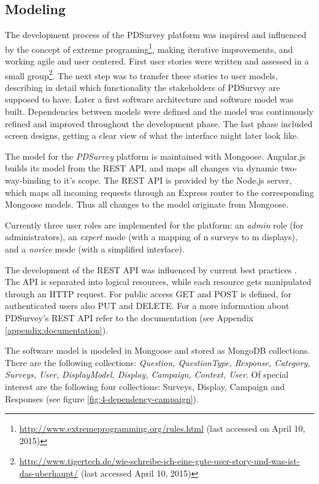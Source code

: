 \clearpage

\subsection{Modeling}
\label{chapter:implementation:modeling}

	The development process of the PDSurvey platform was inspired and influenced by the concept of extreme programing\footnote{\url{http://www.extremeprogramming.org/rules.html} (last accessed on April 10, 2015)}, making iterative improvements, and working agile and user centered. First user stories were written and assessed in a small group\footnote{\url{http://www.tigertech.de/wie-schreibe-ich-eine-gute-user-story-und-was-ist-das-uberhaupt/} (last accessed April 10, 2015)}. The next step was to transfer these stories to user models, describing in detail which functionality the stakeholders of PDSurvey are supposed to have. Later a first software architecture and software model was built. Dependencies between models were defined and the model was continuously refined and improved throughout the development phase. The last phase included screen designs, getting a clear view of what the interface might later look like.

	The model for the \textit{PDSurvey} platform is maintained with Mongoose. Angular.js builds its model from the REST API, and maps all changes via dynamic two-way-binding to it's scope. The REST API is provided by the Node.js server, which maps all incoming requests through an Express router to the corresponding Mongoose models. Thus all changes to the model originate from Mongoose.

	Currently three user roles are implemented for the platform: an \textit{admin} role (for administrators), an \textit{expert} mode (with a mapping of n surveys to m displays), and a \textit{novice} mode (with a simplified interface).

	The development of the REST API was influenced by current best practices \cite{Sahni2015RESTAPI, TutsPlus2015RESTAPI, hughes2012einfuhrung}. The API is separated into logical resources, while each resource gets manipulated through an HTTP request. For public access GET and POST is defined, for authenticated users also PUT and DELETE. For a more information about PDSurvey's REST API refer to the documentation (see Appendix \ref{appendix:documentation}).

	The software model is modeled in Mongoose and stored as MongoDB collections. There are the following collections: \textit{Question, QuestionType, Response, Category, Surveys, User, DisplayModel, Display, Campaign, Context, User}. 
	Of special interest are the following four collections: Surveys, Display, Campaign and Responses (see figure \ref{fig:4-dependency-campaign}).

